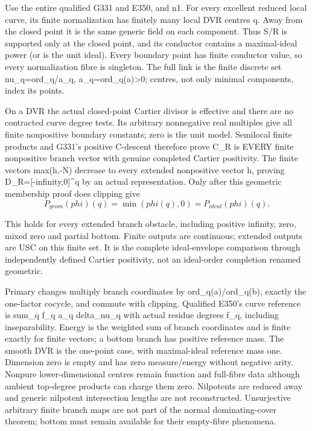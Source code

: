 \documentclass[11pt]{article}
\begin{document}
Use the entire qualified G331 and E350, and n1. For every excellent reduced local curve, its finite normalization has finitely many local DVR centres q. Away from the closed point it is the same generic field on each component. Thus S/R is supported only at the closed point, and its conductor contains a maximal-ideal power (or is the unit ideal). Every boundary point has finite conductor value, so every normalization fibre is singleton. The full link is the finite discrete set nu\_q=ord\_q/a\_q, a\_q=ord\_q(a)>0; centres, not only minimal components, index its points.

On a DVR the actual closed-point Cartier divisor is effective and there are no contracted curve degree tests. Its arbitrary nonnegative real multiples give all finite nonpositive boundary constants; zero is the unit model. Semilocal finite products and G331's positive C-descent therefore prove C\_R is EVERY finite nonpositive branch vector with genuine completed Cartier positivity. The finite vectors max(h,-N) decrease to every extended nonpositive vector h, proving D\_R=[-infinity,0]\textasciicircum{}q by an actual representation. Only after this geometric membership proof does clipping give
\[
P_{geom}(phi)(q)=\min(phi(q),0)=P_{ideal}(phi)(q).
\]

This holds for every extended branch obstacle, including positive infinity, zero, mixed zero and partial bottom. Finite outputs are continuous; extended outputs are USC on this finite set. It is the complete ideal-envelope comparison through independently defined Cartier positivity, not an ideal-order completion renamed geometric.

Primary changes multiply branch coordinates by ord\_q(a)/ord\_q(b), exactly the one-factor cocycle, and commute with clipping. Qualified E350's curve reference is sum\_q f\_q a\_q delta\_nu\_q with actual residue degrees f\_q, including inseparability. Energy is the weighted sum of branch coordinates and is finite exactly for finite vectors; a bottom branch has positive reference mass. The smooth DVR is the one-point case, with maximal-ideal reference mass one. Dimension zero is empty and has zero measure/energy without negative arity. Nonpure lower-dimensional centres remain function and full-fibre data although ambient top-degree products can charge them zero. Nilpotents are reduced away and generic nilpotent intersection lengths are not reconstructed. Unsurjective arbitrary finite branch maps are not part of the normal dominating-cover theorem; bottom must remain available for their empty-fibre phenomena.
\end{document}
